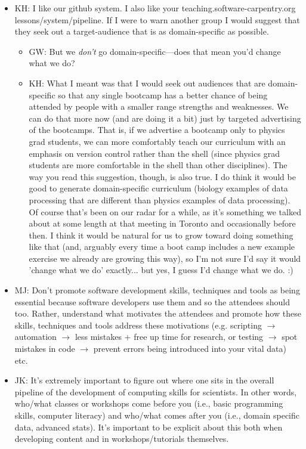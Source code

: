 \documentclass{article}
\begin{document}
\begin{itemize}

  \item KH: I like our github system. I also like your teaching.software-carpentry.org lessons/system/pipeline. If I were to warn another group I would suggest that they seek out a target-audience that is as domain-specific as possible.
    \begin{itemize}
      \item GW: But we \emph{don't} go domain-specific---does that mean you'd change what we do?
      \item KH: What I meant was that I would seek out audiences that are domain-specific so that any single bootcamp has a better chance of being attended by people with a smaller range strengths and weaknesses. We can do that more now (and are doing it a bit) just by targeted advertising of the bootcamps. That is, if we advertise a bootcamp only to physics grad students, we can more comfortably teach our curriculum with an emphasis on version control rather than the shell (since physics grad students are more comfortable in the shell than other disciplines). The way you read this suggestion, though, is also true. I do think it would be good to generate domain-specific curriculum (biology examples of data processing that are different than physics examples of data processing). Of course that's been on our radar for a while, as it's something we talked about at some length at that meeting in Toronto and occasionally before then. I think it would be natural for us to grow toward doing something like that (and, arguably every time a boot camp includes a new example exercise we already are growing this way), so I'm not sure I'd say it would 'change what we do' exactly... but yes, I guess I'd change what we do. :) 
    \end{itemize}

  \item MJ: Don't promote software development skills, techniques and tools as being essential because software developers use them and so the attendees should too. Rather, understand what motivates the attendees and promote how these skills, techniques and tools address these motivations (e.g. scripting $\rightarrow$ automation $\rightarrow$ less mistakes + free up time for research, or testing $\rightarrow$ spot mistakes in code $\rightarrow$ prevent errors being introduced into your vital data) etc.

  \item JK: It's extremely important to figure out where one sits in the overall pipeline of the development of computing skills for scientists. In other words, who/what classes or workshops come before you (i.e., basic programming skills, computer literacy) and who/what comes after you (i.e., domain specific data, advanced stats). It's important to be explicit about this both when developing content and in workshops/tutorials themselves.


\end{itemize}
\end{document}
